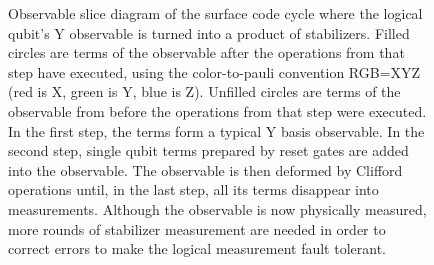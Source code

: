 \documentclass[onecolumn,unpublished,a4paper]{quantumarticle}
\theoremstyle{definition}
\theoremstyle{definition}
\theoremstyle{definition}
\begin{document}
\begin{figure}
    \centering
    \caption{
        Observable slice diagram of the surface code cycle where the logical qubit's Y observable is turned into a product of stabilizers.
        Filled circles are terms of the observable after the operations from that step have executed, using the color-to-pauli convention RGB=XYZ (red is X, green is Y, blue is Z).
        Unfilled circles are terms of the observable from before the operations from that step were executed.
        In the first step, the terms form a typical Y basis observable.
        In the second step, single qubit terms prepared by reset gates are added into the observable.
        The observable is then deformed by Clifford operations until, in the last step, all its terms disappear into measurements.
        Although the observable is now physically measured, more rounds of stabilizer measurement are needed in order to correct errors to make the logical measurement fault tolerant.
    }
    \label{fig:obs_slice}
\end{figure}
\end{document}
